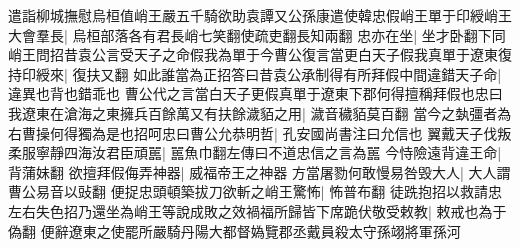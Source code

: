 遣詣柳城撫慰烏桓值峭王嚴五千騎欲助袁譚又公孫康遣使韓忠假峭王單于印綬峭王大會羣長|{
	烏桓部落各有君長峭七笑翻使疏吏翻長知兩翻}
忠亦在坐|{
	坐才卧翻下同}
峭王問招昔袁公言受天子之命假我為單于今曹公復言當更白天子假我真單于遼東復持印綬來|{
	復扶又翻}
如此誰當為正招答曰昔袁公承制得有所拜假中間違錯天子命|{
	違異也背也錯乖也}
曹公代之言當白天子更假真單于遼東下郡何得擅稱拜假也忠曰我遼東在滄海之東擁兵百餘萬又有扶餘濊貊之用|{
	濊音穢貊莫百翻}
當今之埶彊者為右曹操何得獨為是也招呵忠曰曹公允恭明哲|{
	孔安國尚書注曰允信也}
翼戴天子伐叛柔服寧靜四海汝君臣頑嚚|{
	嚚魚巾翻左傳曰不道忠信之言為嚚}
今恃險遠背違王命|{
	背蒲妹翻}
欲擅拜假侮弄神器|{
	威福帝王之神器}
方當屠勠何敢慢易咎毁大人|{
	大人謂曹公易音以䜴翻}
便捉忠頭頓築拔刀欲斬之峭王驚怖|{
	怖普布翻}
徒跣抱招以救請忠左右失色招乃還坐為峭王等說成敗之效禍福所歸皆下席跪伏敬受敕教|{
	敕戒也為于偽翻}
便辭遼東之使罷所嚴騎丹陽大都督媯覽郡丞戴員殺太守孫翊將軍孫河

